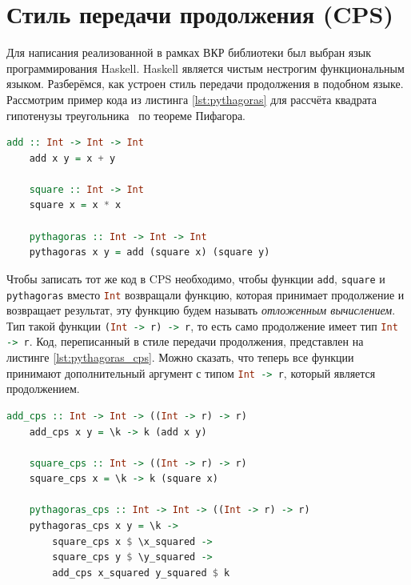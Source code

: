 \documentclass[times]{itmo-student-thesis}
\begin{document}
\section{Стиль передачи продолжения (CPS)}\label{sec:cps}

Для написания реализованной в рамках ВКР библиотеки был выбран язык программирования Haskell. Haskell является чистым нестрогим функциональным языком. 
Разберёмся, как устроен стиль передачи продолжения в подобном языке. Рассмотрим пример кода из листинга 
\ref{lst:pythagoras} для рассчёта квадрата гипотенузы треугольника~\cite{noauthor_haskellcontinuation_nodate} по теореме Пифагора.

\begin{lstlisting}[language=Haskell,float=!h,caption={Теорема Пифагора},label={lst:pythagoras}]
    add :: Int -> Int -> Int
    add x y = x + y

    square :: Int -> Int
    square x = x * x

    pythagoras :: Int -> Int -> Int
    pythagoras x y = add (square x) (square y)
\end{lstlisting}

Чтобы записать тот же код в CPS необходимо, чтобы функции \lstinline[language=Haskell]{add},
\lstinline[language=Haskell]{square} и \lstinline[language=Haskell]{pythagoras} вместо \lstinline[language=Haskell]{Int}
возвращали функцию, которая принимает продолжение и возвращает результат, эту функцию будем называть \textit{отложенным вычислением}. Тип такой функции \lstinline[language=Haskell]{(Int -> r) -> r}, 
то есть само продолжение имеет тип \lstinline[language=Haskell]{Int -> r}. Код, переписанный в стиле передачи продолжения, 
представлен на листинге \ref{lst:pythagoras_cps}. Можно сказать, что теперь все функции принимают дополнительный аргумент 
с типом \lstinline[language=Haskell]{Int -> r}, который является продолжением.

\begin{lstlisting}[language=Haskell,float=!h,caption={Теорема Пифагора в CPS},label={lst:pythagoras_cps}]
    add_cps :: Int -> Int -> ((Int -> r) -> r)
    add_cps x y = \k -> k (add x y)
    
    square_cps :: Int -> ((Int -> r) -> r)
    square_cps x = \k -> k (square x)
    
    pythagoras_cps :: Int -> Int -> ((Int -> r) -> r)
    pythagoras_cps x y = \k ->
        square_cps x $ \x_squared ->
        square_cps y $ \y_squared ->
        add_cps x_squared y_squared $ k
\end{lstlisting}
\end{document}
